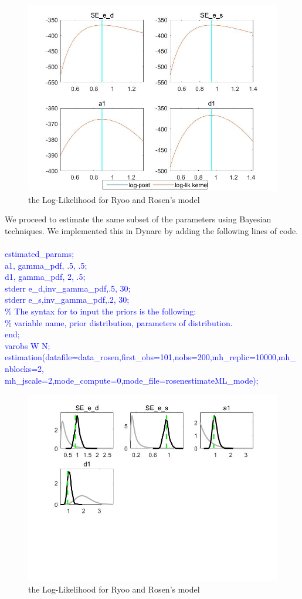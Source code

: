 \documentclass[a4paper,12pt]{scrartcl} %
\begin{document}
\begin{figure}[htbp!]
		\centering
			\includegraphics[width=0.8\linewidth]{fig27.jpg}
            \caption{the Log-Likelihood for Ryoo and Rosen’s model}\label{27}
\end{figure}

\vspace{4cm}

We proceed to estimate the same subset of the parameters using Bayesian techniques. We implemented this in Dynare by adding the following lines of code.\\
\\
\textcolor{blue}{
estimated\_params;\\
a1, gamma\_pdf, .5, .5;\\
d1, gamma\_pdf, 2, .5;\\
stderr e\_d,inv\_gamma\_pdf,.5, 30;\\
stderr e\_s,inv\_gamma\_pdf,.2, 30;\\
\% The syntax for to input the priors is the following:\\
\% variable name, prior distribution, parameters of distribution.\\
end;\\
varobs W N;\\
estimation(datafile=data\_rosen,first\_obs=101,nobs=200,mh\_replic=10000,mh\_nblocks=2,
mh\_jscale=2,mode\_compute=0,mode\_file=rosenestimateML\_mode);}\\

\begin{figure}[htbp!]
		\centering
			\includegraphics[width=0.8\linewidth]{fig28.jpg}
            \caption{the Log-Likelihood for Ryoo and Rosen’s model}\label{28}
\end{figure}
\end{document}
